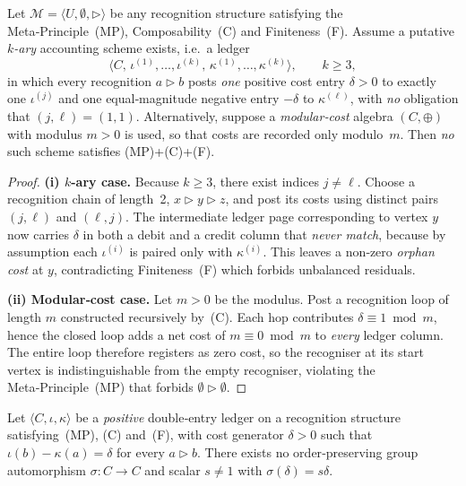 \begin{lemma}\label{lem:k-ary-ledger}
Let \(\mathcal M=\langle U,\emptyset,\triangleright\rangle\) be any
recognition structure satisfying the Meta‑Principle (MP), Composability (C)
and Finiteness (F).
Assume a putative \emph{\(k\)-ary} accounting scheme exists, i.e.\
a ledger
\[
  \bigl\langle
     C,\,
     \iota^{(1)},\dots,\iota^{(k)},\,
     \kappa^{(1)},\dots,\kappa^{(k)}
  \bigr\rangle ,
  \qquad k\ge3,
\]
in which every recognition \(a\triangleright b\) posts
\emph{one} positive cost entry
\(\delta>0\) to exactly one \(\iota^{(j)}\) and
one equal‑magnitude negative entry \(-\delta\) to \(\kappa^{(\ell)}\),
with \emph{no} obligation that \((j,\ell)=(1,1)\).
Alternatively, suppose a \emph{modular‑cost} algebra
\((C,\oplus)\) with modulus \(m>0\) is used,
so that costs are recorded only modulo \(m\).
Then \emph{no} such scheme satisfies \textnormal{(MP)}+\textnormal{(C)}+\textnormal{(F)}.
\end{lemma}

\begin{proof}
\textbf{(i)  \(k\)-ary case.}
Because \(k\ge3\), there exist indices \(j\neq\ell\).
Choose a recognition chain of length 2,
\(x\triangleright y\triangleright z\),
and post its costs using distinct pairs \((j,\ell)\) and \((\ell,j)\).
The intermediate ledger page corresponding to vertex \(y\) now
carries \(\delta\) in both a debit and a credit column that
\emph{never match}, because by assumption each
\(\iota^{(i)}\) is paired only with \(\kappa^{(i)}\).
This leaves a non‑zero \emph{orphan cost} at \(y\),
contradicting Finiteness (F) which forbids unbalanced residuals.

\smallskip
\textbf{(ii)  Modular‑cost case.}
Let \(m>0\) be the modulus. 
Post a recognition loop of length \(m\) constructed recursively by (C).
Each hop contributes \(\delta\equiv1\bmod m\),
hence the closed loop adds a net cost of \(m\equiv0\bmod m\)
to \emph{every} ledger column.
The entire loop therefore registers as zero cost,
so the recogniser at its start vertex
is indistinguishable from the empty recogniser,
violating the Meta‑Principle (MP) that forbids
\(\emptyset\triangleright\emptyset\).
\end{proof}

\begin{lemma}\label{lem:delta-scale}
Let \(\langle C,\iota,\kappa\rangle\) be a
\emph{positive} double‑entry ledger on a recognition structure
satisfying (MP), (C) and (F),
with cost generator \(\delta>0\) such that
\(\iota(b)-\kappa(a)=\delta\) for every \(a\triangleright b\).
There exists no order‑preserving group automorphism
\(\sigma:C\!\to\!C\) and scalar \(s\neq1\) with
\(\sigma(\delta)=s\delta\).
\end{lemma}

